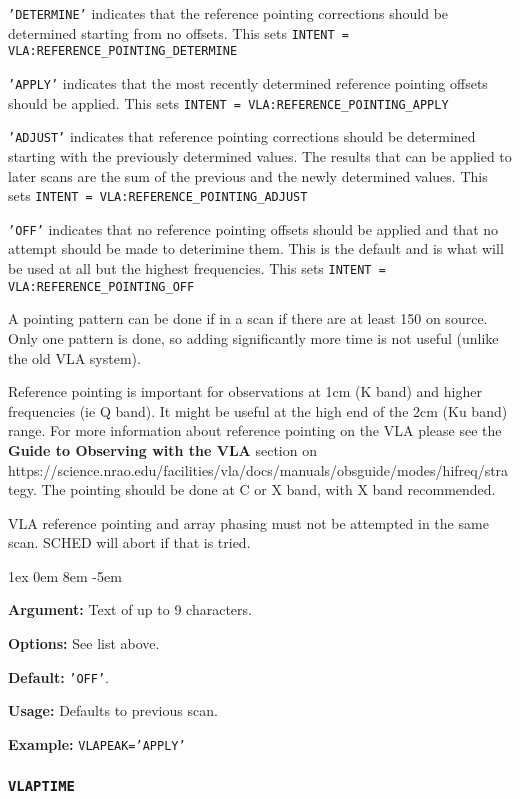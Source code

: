 \documentclass{report}
\newcommand{\rcwbox}[5]{
  \begin{list}{}{\parsep 1ex  \itemsep 0em
                 \leftmargin 8em  \itemindent -5em }
    \item {\bf Argument:} #1
    \item {\bf Options:}  #2
    \item {\bf Default:}  #3
    \item {\bf Usage:}    #4
    \item {\bf Example:}  #5
  \end{list}
}
\begin{document}
\begin{description}

\item {\tt 'DETERMINE'} indicates that the reference pointing
corrections should be determined starting from no offsets.  This sets
{\tt INTENT = VLA:REFERENCE\_POINTING\_DETERMINE}

\item {\tt 'APPLY'} indicates that the most recently determined reference
pointing offsets should be applied.  This sets {\tt INTENT =
VLA:REFERENCE\_POINTING\_APPLY}

\item {\tt 'ADJUST'} indicates that reference pointing corrections should be
determined starting with the previously determined values.  The
results that can be applied to later scans are the sum of the previous
and the newly determined values.  This sets {\tt INTENT =
VLA:REFERENCE\_POINTING\_ADJUST}

\item {\tt 'OFF'} indicates that no reference pointing offsets should be
applied and that no attempt should be made to deterimine them.  This
is the default and is what will be used at all but the highest 
frequencies.  This sets {\tt INTENT = VLA:REFERENCE\_POINTING\_OFF}

\end{description}

A pointing pattern can be done if in a scan if there are at least 150
on source.  Only one pattern is done, so adding significantly more
time is not useful (unlike the old VLA system). 

Reference pointing is important for observations at 1cm (K band) and
higher frequencies (ie Q band).  It might be useful at the high end
of the 2cm (Ku band) range.  For more information about reference
pointing on the VLA please see the {\bf Guide to Observing with the VLA}
section on 
{https://science.nrao.edu/facilities/vla/docs/manuals/obsguide/modes/hifreq/strategy}.
The pointing should be done at C or X band, with X band recommended.

VLA reference pointing and array phasing must not be attempted in
the same scan.  SCHED will abort if that is tried.

\rcwbox
{Text of up to 9 characters.}
{See list above.}
{{\tt 'OFF'}.}
{Defaults to previous scan.}
{{\tt VLAPEAK='APPLY'}}


\subsubsection{\label{MP:VLAPTIME}{\tt VLAPTIME}}
\end{document}

